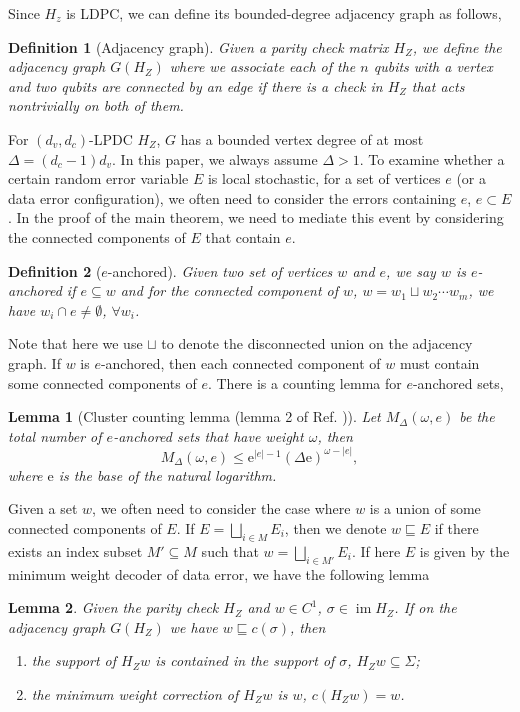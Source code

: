 \documentclass[twoside,english,aps,showpacs,pra,superscriptaddress]{revtex4-2}
\newcommand{\e}{\mathrm{e}}
\DeclareMathOperator{\im}{im}
\newtheorem{lemma}{Lemma}
\newtheorem{definition}{Definition}
\begin{document}
Since $H_z$ is LDPC, we can define its bounded-degree adjacency graph as follows,
\begin{definition}[Adjacency graph]
Given a parity check matrix $H_Z$, we define the adjacency graph $G(H_Z)$ where we associate each of the $n$ qubits with a vertex and two qubits are connected by an edge if there is a check in $H_Z$ that acts nontrivially on both of them.    
\end{definition}
For $(d_v,d_c)$-LPDC $H_Z$, $G$ has a bounded vertex degree of at most $\Delta = (d_c-1)d_v$. In this paper, we always assume $\Delta > 1$.
To examine whether a certain random error variable $E$ is local stochastic,
for a set of vertices $e$ (or a data error configuration), we often need to consider the errors containing $e$, $e\subset E$. In the proof of the main theorem, we need to mediate this event by considering the connected components of $E$ that contain $e$. 
\begin{definition}[$e$-anchored]
Given two set of vertices $w$ and $e$, we say $w$ is $e$-anchored if $e \subseteq w$ and for the connected component of $w$, $w = w_1 \sqcup w_2 \cdots w_m$, we have $w_i \cap e \neq \emptyset$, $\forall w_i$.
\end{definition}
Note that here we use $\sqcup$ to denote the disconnected union on the adjacency graph. If $w$ is $e$-anchored, then each connected component of $w$ must contain some connected components of $e$. 
There is a counting lemma for $e$-anchored sets,
\begin{lemma}[Cluster counting lemma (lemma 2 of Ref. \cite{gottesmanFaultTolerantQuantumComputation2014})]
\label{lemma:counting}
Let $M_\Delta(\omega,e)$ be the total number of $e$-anchored sets that have weight $\omega$, then 
\begin{equation}
    M_\Delta(\omega,e) \leq \e^{|e|-1}(\Delta \e)^{\omega - |e|},
\end{equation}
where $\e$ is the base of the natural logarithm.
\end{lemma}
Given a set $w$, we often need to consider the case where $w$ is a union of some connected components of $E$. If $E = \bigsqcup_{i \in M} E_i$, then we denote $w \sqsubseteq E$ if there exists an index subset $M' \subseteq M$ such that $w = \bigsqcup_{i \in M'} E_i$. If here $E$ is given by the minimum weight decoder of data error, we have the following lemma
\begin{lemma}
\label{lemma:UCC}
    Given the parity check $H_Z$ and $w \in C^1$, $\sigma \in \im H_Z$. If on the adjacency graph $G(H_Z)$ we have $w \sqsubseteq c(\sigma)$, then 
    \begin{enumerate}
        \item the support of $H_Z w$ is contained in the support of $\sigma$, $H_Z w \subseteq \Sigma$;
        \item the minimum weight correction of $H_Z w$ is $w$, $c(H_Z w) = w$.
    \end{enumerate}
\end{lemma}
\end{document}
